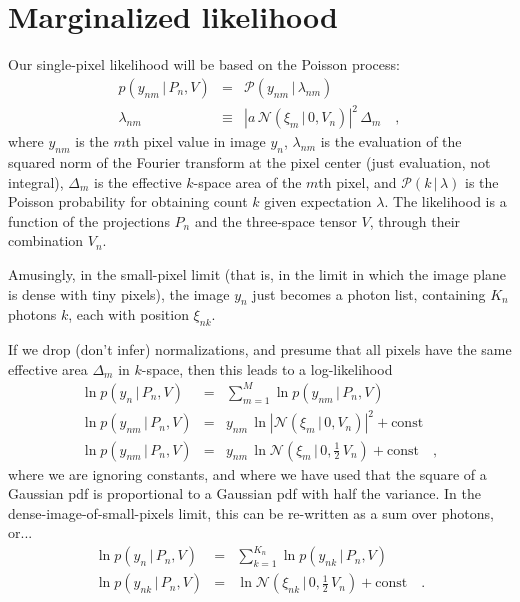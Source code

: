 \documentclass[12pt]{article}
\newcommand{\normal}{\mathscr{N}}
\newcommand{\Poisson}{\mathscr{P}}
\newcommand{\sqnorm}[1]{|{#1}|^2}
\newcommand{\given}{\,|\,}
\begin{document}
\section{Marginalized likelihood}

Our single-pixel likelihood will be based on the Poisson process:
\begin{eqnarray}
  p(y_{nm}\given P_n,V) &=& \Poisson(y_{nm}\given\lambda_{nm})
  \\
  \lambda_{nm} &\equiv& \sqnorm{a\,\normal(\xi_m\given 0,V_n)}\,\Delta_m
  \quad,
\end{eqnarray}
where $y_{nm}$ is the $m$th pixel value in image $y_n$,
$\lambda_{nm}$ is the evaluation of the squared norm of the Fourier
transform at the pixel center (just evaluation, not integral),
$\Delta_m$ is the effective $k$-space area of the $m$th pixel,
and $\Poisson(k\given\lambda)$ is the Poisson probability for obtaining
count $k$ given expectation $\lambda$.
The likelihood is a function of the projections $P_n$ and the
three-space tensor $V$, through their combination $V_n$.

Amusingly, in the small-pixel limit (that is, in the limit in which
the image plane is dense with tiny pixels), the image $y_n$ just
becomes a photon list, containing $K_n$ photons $k$, each with
position $\xi_{nk}$.

If we drop (don't infer) normalizations, and presume that all pixels
have the same effective area $\Delta_m$ in $k$-space, then this leads
to a log-likelihood
\begin{eqnarray}
  \ln p(y_n\given P_n,V) &=& \sum_{m=1}^M \ln p(y_{nm}\given P_n,V)
  \\
  \ln p(y_{nm}\given P_n,V) &=& y_{nm}\,\ln \sqnorm{\normal(\xi_m\given 0,V_n)} + \mbox{const}
  \\
  \ln p(y_{nm}\given P_n,V) &=& y_{nm}\,\ln \normal(\xi_m\given 0,\frac{1}{2}\,V_n) + \mbox{const}
  \quad,
\end{eqnarray}
where we are ignoring constants, and where we have used that the square
of a Gaussian pdf is proportional to a Gaussian pdf with half the variance.
In the dense-image-of-small-pixels limit, this can be re-written as a
sum over photons, or...
\begin{eqnarray}
  \ln p(y_n\given P_n,V) &=& \sum_{k=1}^{K_n} \ln p(y_{nk}\given P_n,V)
  \\
  \ln p(y_{nk}\given P_n,V) &=& \ln \normal(\xi_{nk}\given 0,\frac{1}{2}\,V_n) + \mbox{const}
  \quad.
\end{eqnarray}
\end{document}
